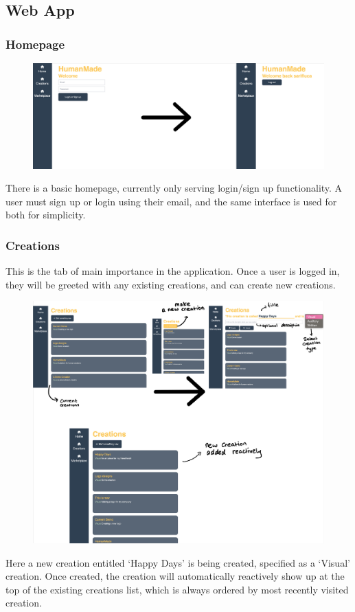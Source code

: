 \documentclass[12pt,a4paper]{article}
\begin{document}
\subsection{Web App}
\subsubsection{Homepage}
\begin{figure}[H]
    \centering
    \includegraphics[scale=0.2]{login.png}
\end{figure}
There is a basic homepage, currently only serving login/sign up functionality. A user must sign up or login using their email, and the same interface is used for both for simplicity.
\subsubsection{Creations}
This is the tab of main importance in the application. Once a user is logged in, they will be greeted with any existing creations, and can create new creations.
\begin{figure}[H]
    \centering
    \includegraphics[scale=0.35]{creations.png}
\end{figure}
\noindent Here a new creation entitled `Happy Days' is being created, specified as a `Visual' creation. Once created, the creation will automatically reactively show up at the top of the existing creations list, which is always ordered by most recently visited creation. 
\end{document}
